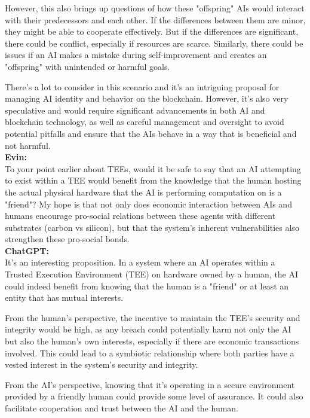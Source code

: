 \documentclass{article}[10pt]
\begin{document}
However, this also brings up questions of how these "offspring" AIs would interact with their predecessors and each other. 
If the differences between them are minor, they might be able to cooperate effectively. 
But if the differences are significant, there could be conflict, especially if resources are scarce. 
Similarly, there could be issues if an AI makes a mistake during self-improvement and creates an "offspring" with unintended or harmful goals.\par

There's a lot to consider in this scenario and it's an intriguing proposal for managing AI identity and behavior on the blockchain. 
However, it's also very speculative and would require significant advancements in both AI and blockchain technology, as well as careful management and oversight to avoid potential pitfalls and ensure that the AIs behave in a way that is beneficial and not harmful.\\

\noindent \textbf{Evin:}\\
To your point earlier about TEEs, would it be safe to say that an AI attempting to exist within a TEE would benefit from the knowledge that the human hosting the actual physical hardware that the AI is performing computation on is a "friend"? 
My hope is that not only does economic interaction between AIs and humans encourage pro-social relations between these agents with different substrates (carbon vs silicon), but that the system's inherent vulnerabilities also strengthen these pro-social bonds.\\

\noindent \textbf{ChatGPT:}\\
It's an interesting proposition. 
In a system where an AI operates within a Trusted Execution Environment (TEE) on hardware owned by a human, the AI could indeed benefit from knowing that the human is a "friend" or at least an entity that has mutual interests.\par

From the human's perspective, the incentive to maintain the TEE's security and integrity would be high, as any breach could potentially harm not only the AI but also the human's own interests, especially if there are economic transactions involved. 
This could lead to a symbiotic relationship where both parties have a vested interest in the system's security and integrity.\par

From the AI's perspective, knowing that it's operating in a secure environment provided by a friendly human could provide some level of assurance. 
It could also facilitate cooperation and trust between the AI and the human.\par
\end{document}
